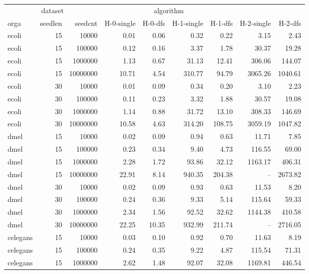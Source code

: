 \begin{tabular}{lrrrrrrrr}
  \toprule
\multicolumn{3}{c}{dataset} &\multicolumn{4}{c}{algorithm}\\
\cmidrule{1-3} \cmidrule{4-7}orga & seedlen & seedcnt & H-0-single & H-0-dfs & H-1-single & H-1-dfs & H-2-single & H-2-dfs \\ 
  \midrule ecoli &  15 & 10000 & 0.01 & 0.06 & 0.32 & 0.22 & 3.15 & 2.43 \\ 
  ecoli &  15 & 100000 & 0.12 & 0.16 & 3.37 & 1.78 & 30.37 & 19.28 \\ 
  ecoli &  15 & 1000000 & 1.13 & 0.67 & 31.13 & 12.41 & 306.06 & 144.07 \\ 
  ecoli &  15 & 10000000 & 10.71 & 4.54 & 310.77 & 94.79 & 3065.26 & 1040.61 \\ 
  ecoli &  30 & 10000 & 0.01 & 0.09 & 0.34 & 0.20 & 3.10 & 2.23 \\ 
  ecoli &  30 & 100000 & 0.11 & 0.23 & 3.32 & 1.88 & 30.57 & 19.08 \\ 
  ecoli &  30 & 1000000 & 1.14 & 0.88 & 31.72 & 13.10 & 308.33 & 146.69 \\ 
  ecoli &  30 & 10000000 & 10.58 & 4.63 & 314.20 & 108.75 & 3059.19 & 1047.82 \\ 
  dmel &  15 & 10000 & 0.02 & 0.09 & 0.94 & 0.63 & 11.71 & 7.85 \\ 
  dmel &  15 & 100000 & 0.23 & 0.34 & 9.40 & 4.73 & 116.55 & 69.00 \\ 
  dmel &  15 & 1000000 & 2.28 & 1.72 & 93.86 & 32.12 & 1163.17 & 406.31 \\ 
  dmel &  15 & 10000000 & 22.91 & 8.14 & 940.35 & 204.38 & -- & 2673.82 \\ 
  dmel &  30 & 10000 & 0.02 & 0.09 & 0.93 & 0.63 & 11.53 & 8.20 \\ 
  dmel &  30 & 100000 & 0.24 & 0.36 & 9.33 & 5.14 & 115.64 & 59.33 \\ 
  dmel &  30 & 1000000 & 2.34 & 1.56 & 92.52 & 32.62 & 1144.38 & 410.58 \\ 
  dmel &  30 & 10000000 & 22.25 & 10.35 & 932.99 & 211.74 & -- & 2716.05 \\ 
  celegans &  15 & 10000 & 0.03 & 0.10 & 0.92 & 0.70 & 11.63 & 8.19 \\ 
  celegans &  15 & 100000 & 0.24 & 0.35 & 9.22 & 4.87 & 115.54 & 71.31 \\ 
  celegans &  15 & 1000000 & 2.62 & 1.48 & 92.07 & 32.08 & 1169.81 & 446.54 \\ 

\end{tabular}

